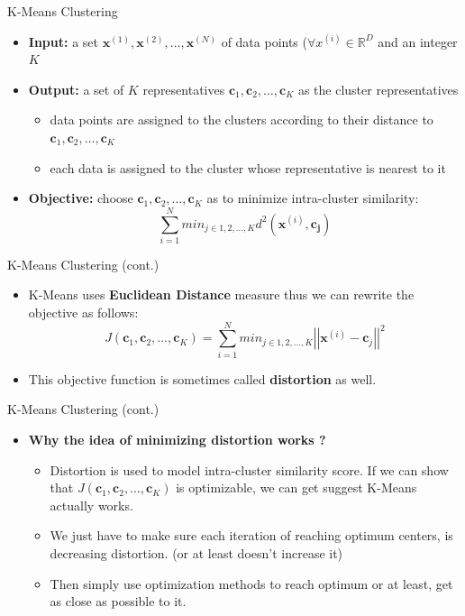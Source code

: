 \documentclass[serif, aspectratio=169]{beamer}
\begin{document}
\begin{frame}{K-Means Clustering}
    \begin{itemize}
        \item \textbf{Input:} a set \( \mathbf{x}^{(1)}, \mathbf{x}^{(2)}, \dots, \mathbf{x}^{(N)} \) of data points (\( \forall x^{(i)} \in \mathbb{R}^D \) and an integer \( K \)
        \item \textbf{Output:} a set of \( K \) representatives \( \mathbf{c}_1, \mathbf{c}_2, \dots, \mathbf{c}_K \) as the cluster representatives
        \begin{itemize}
            \item data points are assigned to the clusters according to their distance to \(\mathbf{c}_1, \mathbf{c}_2, \dots, \mathbf{c}_K \)
            \item each data is assigned to the cluster whose representative is nearest to it
        \end{itemize}
        \item \textbf{Objective:} choose \( \mathbf{c}_1, \mathbf{c}_2, \dots, \mathbf{c}_K \) as to minimize intra-cluster similarity:
        \[
            \sum_{i=1}^{N} min_{j \in 1,2,\dots, K} d^2 \left( \mathbf{x}^{(i)}, \mathbf{c_j} \right)
        \]
    \end{itemize}
\end{frame}

\begin{frame}{K-Means Clustering (cont.)}
    \begin{itemize}
        \item K-Means uses \textbf{Euclidean Distance} measure thus we can rewrite the objective as follows:
        \[
        J\left( \mathbf{c}_1, \mathbf{c}_2, \dots, \mathbf{c}_K \right) = \sum_{i=1}^{N} min_{j \in 1,2,\dots, K} \left| \left| \mathbf{x}^{(i)} - \mathbf{c}_j \right|\right|^2
        \]
        \item This objective function is sometimes called \textbf{distortion} as well.
    \end{itemize}
\end{frame}

\begin{frame}{K-Means Clustering (cont.)}
    \begin{itemize}
        \item \textbf{Why the idea of minimizing distortion works ?}
        \begin{itemize}
            \item Distortion is used to model intra-cluster similarity score. If we can show that \( J( \mathbf{c}_1, \mathbf{c}_2, \dots, \mathbf{c}_K ) \) is optimizable, we can get suggest K-Means actually works.
            \item We just have to make sure each iteration of reaching optimum centers, is decreasing distortion. (or at least doesn't increase it)
            \item Then simply use optimization methods to reach optimum or at least, get as close as possible to it.
        \end{itemize}
    \end{itemize}
\end{frame}
\end{document}
